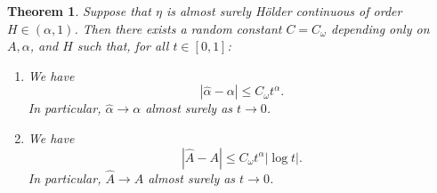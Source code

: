 \documentclass[11pt,reqno,oneside, a4paper]{amsart}
\numberwithin{equation}{section}
\newtheorem{thm}{Theorem}[section]
\theoremstyle{remark}
\begin{document}
\begin{thm}\label{thm:a_alpha_consistency}
    Suppose that $\eta$ is almost surely H\"older continuous of order $H\in(\alpha,1)$. Then there exists a random constant $C=C_\omega$ depending only on $A,\alpha$, and $H$ such that, for all $t\in [0,1]$: 
    \begin{enumerate}
    \item We have \begin{equation}
    \label{eq:alpha-consistent}
    |\hat\alpha - \alpha|\leq C_\omega t^{\alpha}.
    \end{equation}
    In particular, $\hat\alpha \to \alpha$ almost surely as $t\to 0$. 
    \item We have
    \begin{equation}
    \label{eq:A-consistent}
    |\hat{A} -A| \leq C_\omega t^\alpha |\log t|.
    \end{equation}
    In particular, $\hat{A} \to A$ almost surely as  $t\to 0$.
    \end{enumerate}
\end{thm}
\end{document}
